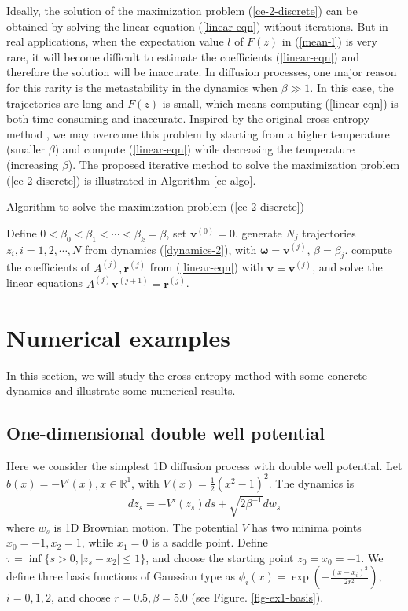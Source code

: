 \documentclass[final]{siamltex}
\begin{document}
Ideally, the solution of the maximization problem (\ref{ce-2-discrete}) can be
obtained by solving the linear equation (\ref{linear-eqn}) without iterations. But in real
applications, when the expectation value $l$ of $F(z)$ in (\ref{mean-l}) is very rare, it will become
difficult to estimate the coefficients (\ref{linear-eqn}) and therefore the solution
will be inaccurate. In diffusion processes, one major reason for this rarity
is the metastability in the dynamics when $\beta \gg 1$. In this case, the
trajectories are long and $F(z)$ is small, which means computing
(\ref{linear-eqn}) is both time-consuming and inaccurate. Inspired by the
original cross-entropy method \cite{ce_tutorial},
we may overcome this problem by starting from a higher temperature (smaller $\beta$) and compute
(\ref{linear-eqn}) while decreasing the temperature (increasing $\beta$). The proposed iterative
method to solve the maximization problem (\ref{ce-2-discrete}) is illustrated in Algorithm \ref{ce-algo}.
\begin{algorithm}
  \caption{Algorithm to solve the maximization problem (\ref{ce-2-discrete}) \label{ce-algo}}
  \begin{algorithmic}[1]
    \State Define $0 < \beta_0 < \beta_1 < \cdots <\beta_k = \beta$, set
    $\bm{v}^{(0)} = 0$.
    \State generate $N_j$ trajectories $z_i, i=1,2,\cdots, N$ from dynamics (\ref{dynamics-2}), with
    $\bm{\omega} = \bm{v}^{(j)}$, $\beta = \beta_j$.
    \State compute the coefficients of $A^{(j)}, \bm{r}^{(j)}$ from (\ref{linear-eqn}) with $\bm{v} =
    \bm{v}^{(j)}$, and solve the linear equations $A^{(j)}\bm{v}^{(j+1)} =
    \bm{r}^{(j)}$.
    \EndFor 
  \end{algorithmic}
  \label{algo1}
\end{algorithm}
\FloatBarrier
\section{Numerical examples}
\label{sec-examples}
In this section, we will study the cross-entropy method with some concrete dynamics and
illustrate some numerical results.
\subsection{One-dimensional double well potential}
Here we consider the simplest 1D diffusion process with double well potential.
Let $b(x) = - V'(x), x\in \mathbb{R}^1$, with $V(x) = \frac{1}{2}(x^2 - 1)^2$.
The dynamics is 
\begin{align}
  dz_s = - V'(z_s) ds + \sqrt{2\beta^{-1}} dw_s
\end{align}
where $w_s$ is 1D Brownian motion. The potential $V$ has two minima points
$x_0 = -1, x_2 = 1$, while $x_1 = 0$ is
a saddle point. Define $\tau = \inf\{s >0, |z_s - x_2| \le 1 \}$, and choose
the starting point $z_0 = x_0 =
-1$. We define three basis functions of Gaussian type as $\phi_i(x) = \exp(-\frac{(x -
x_i)^2}{2r^2})$, $i = 0, 1, 2$, and choose $r = 0.5, \beta = 5.0$ (see Figure. \ref{fig-ex1-basis}).
\end{document}
